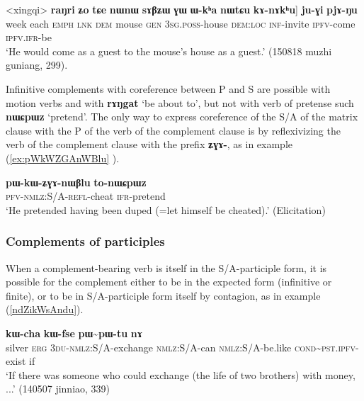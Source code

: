 \documentclass[oldfontcommands,oneside,a4paper,11pt]{article}
\newcommand{\ipa}[1]{\textbf{\phon#1}} %
\newcommand{\jpg}[2]{\ipa{#1} `#2'} %
\newcommand{\tld}{\textasciitilde{}}
\begin{document}
\begin{exe}
\ex \label{ex:kAnAkhu}
\gll <xingqi> 	\ipa{raŋri} 	\ipa{ʑo} 	\ipa{tɕe} 	\ipa{nɯnɯ} \ipa{sɤβʑɯ} 	\ipa{ɣɯ} 	\ipa{ɯ-kʰa} 	\ipa{nɯtɕu} 	\ipa{kɤ-nɤkʰu}] 	\ipa{ju-ɣi} 	\ipa{pjɤ-ŋu} \\
week each \textsc{emph} \textsc{lnk} \textsc{dem} mouse \textsc{gen} \textsc{3sg.poss}-house \textsc{dem:loc} \textsc{inf}-invite \textsc{ipfv}-come \textsc{ipfv.ifr}-be \\
\glt `He would come as a guest to the mouse's house as a guest.' (150818 muzhi guniang, 299).
\end{exe}

Infinitive complements with coreference between P and S are possible with motion verbs and with \jpg{rɤŋgat}{be about to}, but not with verb of pretense such \jpg{nɯɕpɯz}{pretend}. The only way to express coreference of the S/A of the matrix clause with the P of the verb of the complement clause is by reflexivizing the verb of the complement clause with the prefix \ipa{ʑɣɤ-}, as in example (\ref{ex:pWkWZGAnWBlu} ).

  \begin{exe}
   \ex   \label{ex:pWkWZGAnWBlu} 
\gll \ipa{pɯ-kɯ-ʑɣɤ-nɯβlu} \ipa{to-nɯɕpɯz} \\
\textsc{pfv-nmlz:S/A-refl}-cheat \textsc{ifr}-pretend \\
\glt  `He pretended having been duped (=let himself be cheated).' (Elicitation)
    \end{exe}  
    
\subsubsection{Complements of participles}
When a complement-bearing verb is itself in the S/A-participle form, it is possible for the complement either to be in the expected form (infinitive or finite), or to be in S/A-participle form itself by contagion, as in example (\ref{ndZikWsAndu}).

\begin{exe}
\ex \label{ndZikWsAndu}
\gll [\ipa{rŋɯl} 	\ipa{kɯ} 	\ipa{ndʑi-kɯ-sɤndu}] 	\ipa{kɯ-cha} 	\ipa{kɯ-fse} 	\ipa{pɯ\tld{}pɯ-tu} 	\ipa{nɤ} \\
silver \textsc{erg} \textsc{3du-nmlz}:S/A-exchange \textsc{nmlz}:S/A-can \textsc{nmlz}:S/A-be.like 
\textsc{cond}\tld{}\textsc{pst.ipfv}-exist if \\
\glt `If there was someone who could exchange (the life of two brothers) with money, ...' (140507 jinniao, 339)
\end{exe}
\end{document}
